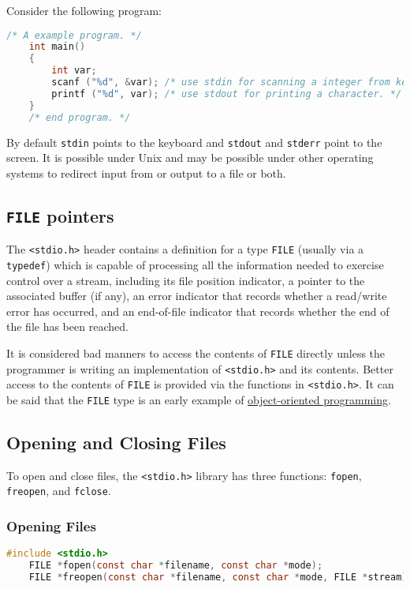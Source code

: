 Consider the following program:

\lstset{basicstyle=\scriptsize, numbers=left, captionpos=b, tabsize=4}
\begin{lstlisting}[caption=Section \thesection listing \arabic{filecnt},language={C},
breaklines=true,xleftmargin=15pt,label=lst:section\thesection listing\arabic{filecnt}]
	/* A example program. */
	int main()
	{
	    int var;
	    scanf ("%d", &var); /* use stdin for scanning a integer from keyboard. */
	    printf ("%d", var); /* use stdout for printing a character. */
	}
	/* end program. */
\end{lstlisting}

By default \texttt{stdin} points to the keyboard and \texttt{stdout} and
\texttt{stderr} point to the screen. It is possible under Unix and may be
possible under other operating systems to redirect input from or output to a
file or both.

\subsection{\texttt{FILE} pointers}
The \texttt{\textless{}stdio.h\textgreater{}} header contains a definition for
a type \texttt{FILE} (usually via a \texttt{typedef}) which is capable of
processing all the information needed to exercise control over a stream,
including its file position indicator, a pointer to the associated buffer (if
any), an error indicator that records whether a read/write error has occurred,
and an end-of-file indicator that records whether the end of the file has been
reached.

It is considered bad manners to access the contents of \texttt{FILE} directly
unless the programmer is writing an implementation of
\texttt{\textless{}stdio.h\textgreater{}} and its contents. Better access to
the contents of \texttt{FILE} is provided via the functions in
\texttt{\textless{}stdio.h\textgreater{}}. It can be said that the
\texttt{FILE} type is an early example of
\href{http://en.wikipedia.org/wiki/Object-oriented\_programming}{object-oriented
programming}.

\subsection{Opening and Closing Files}
To open and close files, the \texttt{\textless{}stdio.h\textgreater{}} library
has three functions: \texttt{fopen}, \texttt{freopen}, and \texttt{fclose}.
\subsubsection{Opening Files}
\lstset{basicstyle=\scriptsize, numbers=left, captionpos=b, tabsize=4}
\begin{lstlisting}[caption=Section \thesection listing \arabic{filecnt},language={C},
breaklines=true,xleftmargin=15pt,label=lst:section\thesection listing\arabic{filecnt}]
	#include <stdio.h>
	FILE *fopen(const char *filename, const char *mode);
	FILE *freopen(const char *filename, const char *mode, FILE *stream);
\end{lstlisting}

